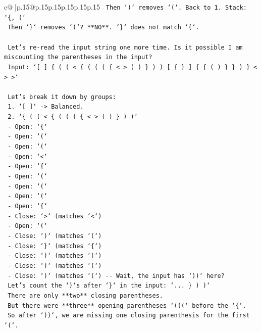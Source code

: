 \documentclass{article}
\begin{document}
{\begin{supertabular}{c@{$\;$}|p{.15\linewidth}@{}p{.15\linewidth}p{.15\linewidth}p{.15\linewidth}p{.15\linewidth}p{.15\linewidth}}
{{{\texttt{   Then `)` removes `(`. Back to 1. Stack: `\{, (`} \\
\texttt{   Then `\}` removes `(`? **NO**. `\}` does not match `(`.} \\
\\ 
\texttt{   Let's re{-}read the input string one more time. Is it possible I am miscounting the parentheses in the input?} \\
\texttt{   Input: `{[} {]} \{ ( ( < \{ ( ( ( \{ < > ( ) \} ) ) {[} \{ \} {]} \{ \{ ( ) \} \} ) \} < > >`} \\
\\ 
\texttt{   Let's break it down by groups:} \\
\texttt{   1. `{[} {]}` {-}> Balanced.} \\
\texttt{   2. `\{ ( ( < \{ ( ( ( \{ < > ( ) \} ) )`} \\
\texttt{      {-} Open: `\{`} \\
\texttt{      {-} Open: `(`} \\
\texttt{      {-} Open: `(`} \\
\texttt{      {-} Open: `<`} \\
\texttt{      {-} Open: `\{`} \\
\texttt{      {-} Open: `(`} \\
\texttt{      {-} Open: `(`} \\
\texttt{      {-} Open: `(`} \\
\texttt{      {-} Open: `\{`} \\
\texttt{      {-} Close: `>` (matches `<`)} \\
\texttt{      {-} Open: `(`} \\
\texttt{      {-} Close: `)` (matches `(`)} \\
\texttt{      {-} Close: `\}` (matches `\{`)} \\
\texttt{      {-} Close: `)` (matches `(`)} \\
\texttt{      {-} Close: `)` (matches `(`)} \\
\texttt{      {-} Close: `)` (matches `(`) {-}{-} Wait, the input has `))` here?} \\
\texttt{      Let's count the `)`s after `\}` in the input: `... \} ) )`} \\
\texttt{      There are only **two** closing parentheses.} \\
\texttt{      But there were **three** opening parentheses `(((` before the `\{`.} \\
\texttt{      So after `))`, we are missing one closing parenthesis for the first `(`.} \\
}}}
\end{supertabular}}
\end{document}
